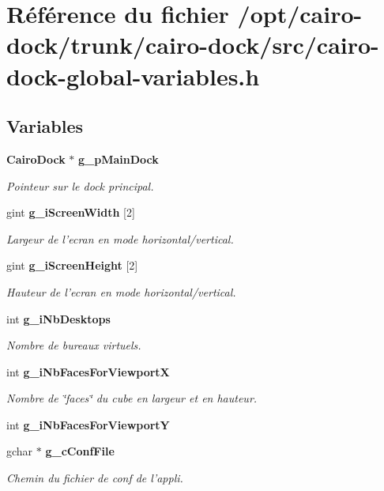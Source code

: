\section{Référence du fichier /opt/cairo-dock/trunk/cairo-dock/src/cairo-dock-global-variables.h}
\label{cairo-dock-global-variables_8h}
\subsection*{Variables}
\begin{CompactItemize}
\item 
{\bf CairoDock} $\ast$ {\bf g\_\-pMainDock}
\begin{CompactList}\small\item\em Pointeur sur le dock principal. \item\end{CompactList}\item 
gint {\bf g\_\-iScreenWidth} [2]
\begin{CompactList}\small\item\em Largeur de l'ecran en mode horizontal/vertical. \item\end{CompactList}\item 
gint {\bf g\_\-iScreenHeight} [2]
\begin{CompactList}\small\item\em Hauteur de l'ecran en mode horizontal/vertical. \item\end{CompactList}\item 
int {\bf g\_\-iNbDesktops}
\begin{CompactList}\small\item\em Nombre de bureaux virtuels. \item\end{CompactList}\item 
int {\bf g\_\-iNbFacesForViewportX}
\begin{CompactList}\small\item\em Nombre de \char`\"{}faces\char`\"{} du cube en largeur et en hauteur. \item\end{CompactList}\item 
int {\bf g\_\-iNbFacesForViewportY}
\item 
gchar $\ast$ {\bf g\_\-cConfFile}
\begin{CompactList}\small\item\em Chemin du fichier de conf de l'appli. \item\end{CompactList}\item 

\end{CompactItemize}
